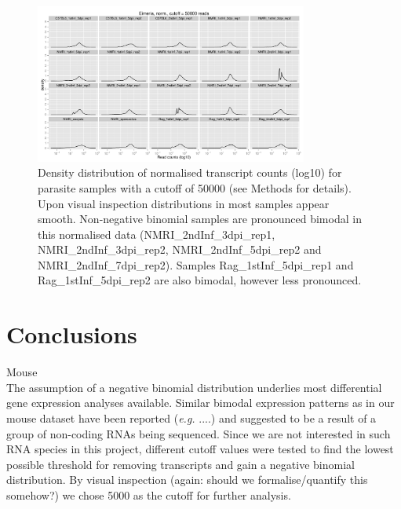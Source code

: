 \documentclass{article}
\begin{document}
\begin{figure}[h]
\begin{center}
\includegraphics[width=0.8\textwidth]{distributions_Efnorm50000}
\caption{Density distribution of normalised transcript counts (log10)
  for parasite samples with a cutoff of 50000 (see Methods for
  details). Upon visual inspection distributions in most samples
  appear smooth. Non-negative binomial samples are pronounced bimodal
  in this normalised data (NMRI\_2ndInf\_3dpi\_rep1,
  NMRI\_2ndInf\_3dpi\_rep2, NMRI\_2ndInf\_5dpi\_rep2 and
  NMRI\_2ndInf\_7dpi\_rep2). Samples Rag\_1stInf\_5dpi\_rep1 and
  Rag\_1stInf\_5dpi\_rep2 are also bimodal, however less pronounced.}
\end{center}
\end{figure}



\section{Conclusions}

Mouse\\
The assumption of a negative binomial distribution underlies most
differential gene expression analyses available. Similar bimodal
expression patterns as in our mouse dataset have been reported
(\textit{e.g.} ....) and suggested to be a result of a group of
non-coding RNAs being sequenced. Since we are not interested in such
RNA species in this project, different cutoff values were tested to
find the lowest possible threshold for removing transcripts and gain a
negative binomial distribution. By visual inspection (again: should we
formalise/quantify this somehow?) we chose 5000 as the cutoff for
further analysis.\\
\end{document}
